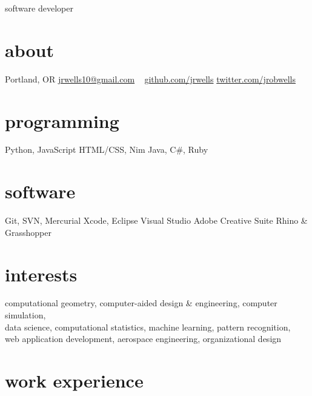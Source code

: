 \documentclass[]{cv}
\begin{document}
       {software developer}

\begin{aside}
  \section{about}
    {Portland, OR}
    \href{mailto:jrwells10@gmail.com}{jrwells10@gmail.com}
    ~
    \href{http://github.com/jrwells}{github.com/jrwells}
    \href{https://twitter.com/jrobwells}{twitter.com/jrobwells}
  \section{programming}
    Python, JavaScript
    HTML/CSS, Nim
    Java, C\#, Ruby
  \section{software}
    Git, SVN, Mercurial
    Xcode, Eclipse
    Visual Studio
    Adobe Creative Suite
    Rhino \& Grasshopper
\end{aside}

\section{interests}

computational geometry, computer-aided design \& engineering, computer simulation, \\
data science, computational statistics, machine learning, pattern recognition, \\
web application development, aerospace engineering, organizational design

\section{work experience}
\end{document}
